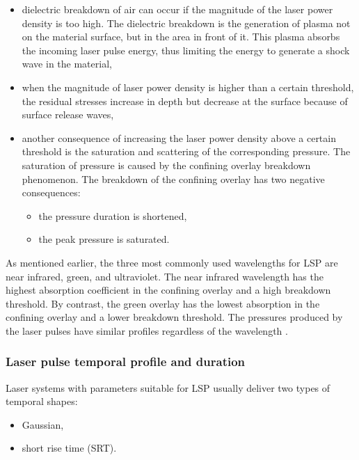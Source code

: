 \begin{itemize}

    \item dielectric breakdown of air can occur if the magnitude of the laser power density is too high. The dielectric breakdown is the generation of plasma not on the material surface, but in the area in front of it. This plasma absorbs the incoming laser pulse energy, thus limiting the energy to generate a shock wave in the material,

    \item when the magnitude of laser power density is higher than a certain threshold, the residual stresses increase in depth but decrease at the surface because of surface release waves,

    \item another consequence of increasing the laser power density above a certain threshold is the saturation and scattering of the corresponding pressure. The saturation of pressure is caused by the confining overlay breakdown phenomenon. The breakdown of the confining overlay has two negative consequences: 
    
    \begin{itemize}
        \item the pressure duration is shortened,
        \item the peak pressure is saturated.
    \end{itemize}
  
  
\end{itemize}    
As mentioned earlier, the three most commonly used wavelengths for LSP are near infrared, green, and ultraviolet. The near infrared wavelength has the highest absorption coefficient in the confining overlay and a high breakdown threshold. By contrast, the green overlay has the lowest absorption in the confining overlay and a lower breakdown threshold. The pressures produced by the laser pulses have similar profiles regardless of the wavelength \cite{berthe_fabbro_peyre_bartnicki_1999}.



\subsubsection*{Laser pulse temporal profile and duration}

Laser systems with parameters suitable for LSP usually deliver two types of temporal shapes:

\begin{itemize}

    \item Gaussian,
    \item short rise time (SRT).
    
\end{itemize}

